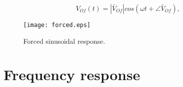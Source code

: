 \begin{equation}
  V_{Of}(t) = |\bar{V}_{Of}| cos(\omega t + \angle \bar{V}_{Of}),
  \label{eq:vo_for}
\end{equation}

\lipsum[1-1]


\begin{figure}[h] \centering
\texttt{[image: forced.eps]}
\caption{Forced sinusoidal response.}
\label{fig:forced}
\end{figure}

\section{Frequency response}

\lipsum[1-1]


